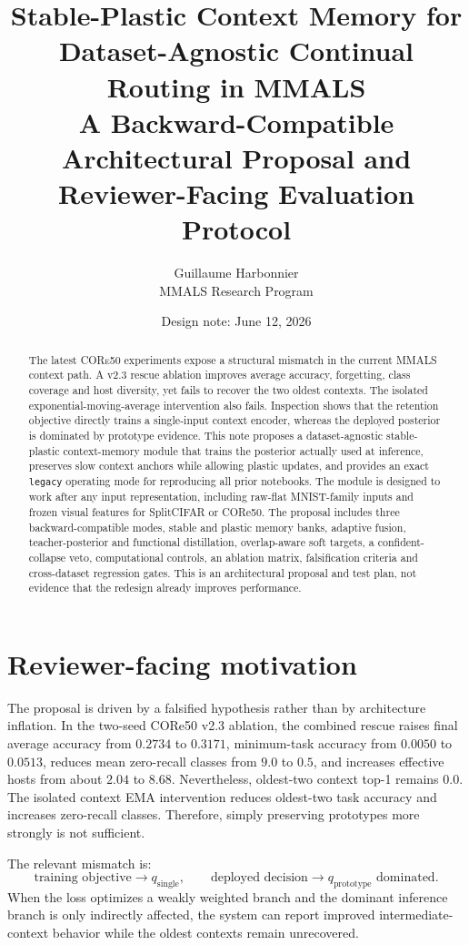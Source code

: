 \documentclass[10pt]{article}
\title{\textbf{Stable-Plastic Context Memory for Dataset-Agnostic Continual Routing in MMALS}\\
\large A Backward-Compatible Architectural Proposal and Reviewer-Facing Evaluation Protocol}
\author{Guillaume Harbonnier\\MMALS Research Program}
\date{Design note: June 12, 2026}
\newcommand{\mmals}{\textsc{MMALS}}
\begin{document}
\maketitle

\begin{abstract}
The latest \textsc{CORe50} experiments expose a structural mismatch in the current \mmals{} context path. A v2.3 rescue ablation improves average accuracy, forgetting, class coverage and host diversity, yet fails to recover the two oldest contexts. The isolated exponential-moving-average intervention also fails. Inspection shows that the retention objective directly trains a single-input context encoder, whereas the deployed posterior is dominated by prototype evidence. This note proposes a dataset-agnostic stable-plastic context-memory module that trains the posterior actually used at inference, preserves slow context anchors while allowing plastic updates, and provides an exact \texttt{legacy} operating mode for reproducing all prior notebooks. The module is designed to work after any input representation, including raw-flat MNIST-family inputs and frozen visual features for SplitCIFAR or CORe50. The proposal includes three backward-compatible modes, stable and plastic memory banks, adaptive fusion, teacher-posterior and functional distillation, overlap-aware soft targets, a confident-collapse veto, computational controls, an ablation matrix, falsification criteria and cross-dataset regression gates. This is an architectural proposal and test plan, not evidence that the redesign already improves performance.
\end{abstract}

\section{Reviewer-facing motivation}
The proposal is driven by a falsified hypothesis rather than by architecture inflation. In the two-seed CORe50 v2.3 ablation, the combined rescue raises final average accuracy from $0.2734$ to $0.3171$, minimum-task accuracy from $0.0050$ to $0.0513$, reduces mean zero-recall classes from $9.0$ to $0.5$, and increases effective hosts from about $2.04$ to $8.68$. Nevertheless, oldest-two context top-1 remains $0.0$. The isolated context EMA intervention reduces oldest-two task accuracy and increases zero-recall classes. Therefore, simply preserving prototypes more strongly is not sufficient.

The relevant mismatch is:
\begin{equation}
\text{training objective} \longrightarrow q_{\mathrm{single}},
\qquad
\text{deployed decision} \longrightarrow q_{\mathrm{prototype}} \text{ dominated}.
\end{equation}
When the loss optimizes a weakly weighted branch and the dominant inference branch is only indirectly affected, the system can report improved intermediate-context behavior while the oldest contexts remain unrecovered.
\end{document}

